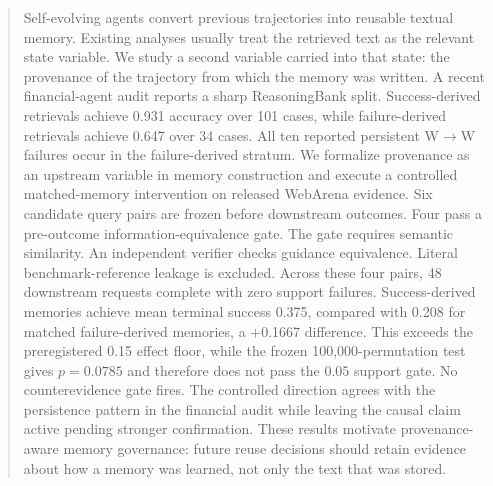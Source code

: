 \begin{abstract}
Self-evolving agents convert previous trajectories into reusable textual memory. Existing analyses usually treat the retrieved text as the relevant state variable. We study a second variable carried into that state: the provenance of the trajectory from which the memory was written. A recent financial-agent audit reports a sharp ReasoningBank split. Success-derived retrievals achieve 0.931 accuracy over 101 cases, while failure-derived retrievals achieve 0.647 over 34 cases. All ten reported persistent W$\rightarrow$W failures occur in the failure-derived stratum. We formalize provenance as an upstream variable in memory construction and execute a controlled matched-memory intervention on released WebArena evidence. Six candidate query pairs are frozen before downstream outcomes. Four pass a pre-outcome information-equivalence gate. The gate requires semantic similarity. An independent verifier checks guidance equivalence. Literal benchmark-reference leakage is excluded. Across these four pairs, 48 downstream requests complete with zero support failures. Success-derived memories achieve mean terminal success 0.375, compared with 0.208 for matched failure-derived memories, a +0.1667 difference. This exceeds the preregistered 0.15 effect floor, while the frozen 100,000-permutation test gives $p=0.0785$ and therefore does not pass the $0.05$ support gate. No counterevidence gate fires. The controlled direction agrees with the persistence pattern in the financial audit while leaving the causal claim active pending stronger confirmation. These results motivate provenance-aware memory governance: future reuse decisions should retain evidence about how a memory was learned, not only the text that was stored.
\end{abstract}
